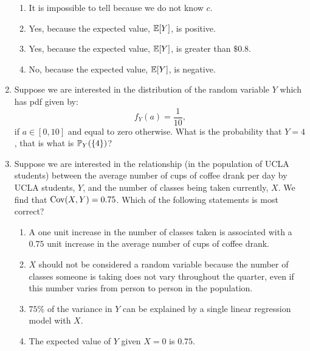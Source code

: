 \documentclass[10pt]{article}
\begin{document}
\begin{enumerate}
	 \begin{enumerate}
		\item It is impossible to tell because we do not know \(c\).
		\item Yes, because the expected value, \(\E[Y]\), is positive.
		\item Yes, because the expected value, \(\E[Y]\), is greater than \(\$0.8\).
		\item No, because the expected value, \(\E[Y]\), is negative.
	\end{enumerate}
	 
	\item Suppose we are interested in the distribution of the random variable \(Y\) which has pdf given by:
    \[
		f_Y(a) = \frac{1}{10} 
    ,\] 	
	if \(a\in[0,10]\) and equal to zero otherwise. What is the probability that \(Y = 4\), that is what is  \(\P_Y(\{4\})\)?

	 

	\item Suppose we are interested in the relationship (in the population of UCLA students) between the average number of cups of coffee drank per day by UCLA students, \(Y\), and the number of classes being taken currently, \(X\). We find that  \(\Cov(X,Y) = 0.75\). Which of the following statements is most correct?
	 \begin{enumerate}
		\item A one unit increase in the number of classes taken is associated with a \(0.75\) unit increase in the average number of cups of coffee drank.  
		\item \(X\) should not be considered a random variable because the number of classes someone is taking does not vary throughout the quarter, even if this number varies from person to person in the population.
		\item \(75\%\) of the variance in  \(Y\) can be explained by a single linear regression model with  \(X\). 
		\item The expected value of \(Y\) given  \(X=0\) is  \(0.75\).
	\end{enumerate}
	 
\end{enumerate}
\end{document}
